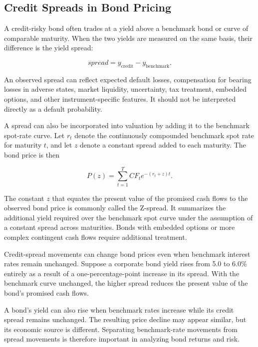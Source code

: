 \subsection{Credit Spreads in Bond Pricing}

A credit-risky bond often trades at a yield above a benchmark bond or curve of comparable maturity. When the two yields are measured on the same basis, their difference is the yield spread:

\begin{equation}
spread
=
y_{\mathrm{credit}}
-
y_{\mathrm{benchmark}}.
\label{eq:ch8-credit-spread}
\end{equation}

An observed spread can reflect expected default losses, compensation for bearing losses in adverse states, market liquidity, uncertainty, tax treatment, embedded options, and other instrument-specific features. It should not be interpreted directly as a default probability.

A spread can also be incorporated into valuation by adding it to the benchmark spot-rate curve. Let $r_t$ denote the continuously compounded benchmark spot rate for maturity $t$, and let $z$ denote a constant spread added to each maturity. The bond price is then

\begin{equation}
P(z)
=
\sum_{t=1}^{T}
CF_t e^{-(r_t+z)t}.
\label{eq:ch8-spread-price}
\end{equation}

The constant $z$ that equates the present value of the promised cash flows to the observed bond price is commonly called the Z-spread. It summarizes the additional yield required over the benchmark spot curve under the assumption of a constant spread across maturities. Bonds with embedded options or more complex contingent cash flows require additional treatment.

Credit-spread movements can change bond prices even when benchmark interest rates remain unchanged. Suppose a corporate bond yield rises from 5.0 to 6.0\% entirely as a result of a one-percentage-point increase in its spread. With the benchmark curve unchanged, the higher spread reduces the present value of the bond's promised cash flows.

A bond's yield can also rise when benchmark rates increase while its credit spread remains unchanged. The resulting price decline may appear similar, but its economic source is different. Separating benchmark-rate movements from spread movements is therefore important in analyzing bond returns and risk.

